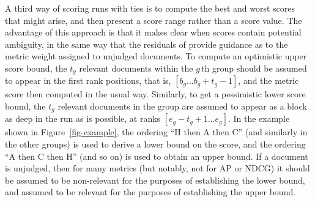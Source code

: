 A third way of scoring runs with ties is to compute the best and
worst scores that might arise, and then present a score range rather
than a score value.
The advantage of this approach is that it makes clear when scores
contain potential ambiguity, in the same way that the residuals of
{\citet{mz08acmtois}} provide guidance as to the metric weight
assigned to unjudged documents.
To compute an optimistic upper score bound, the $t_g$ relevant
documents within the $g$\,th group should be assumed to appear in the
first rank positions, that is, $[b_g\ldots b_g+t_g-1]$, and the
metric score then computed in the usual way.
Similarly, to get a pessimistic lower score bound, the $t_g$ relevant
documents in the group are assumed to appear as a block as deep in
the run as is possible, at ranks $[e_g-t_g+1\ldots e_g]$.
In the example shown in Figure~\ref{fig-example}, the ordering ``H
then A then C'' (and similarly in the other groups) is used to derive
a lower bound on the score, and the ordering ``A then C then H'' (and
so on) is used to obtain an upper bound.
If a document is unjudged, then for many metrics (but notably, not
for AP or NDCG) it should be assumed to be non-relevant for the
purposes of establishing the lower bound, and assumed to be relevant
for the purposes of establishing the upper bound.


